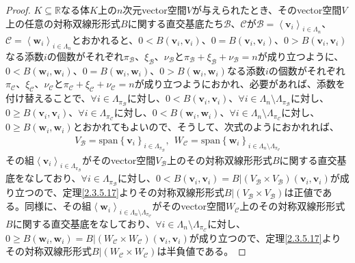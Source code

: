 \documentclass[dvipdfmx]{jsarticle}
\begin{document}
\begin{proof}
$K \subseteq \mathbb{R}$なる体$K$上の$n$次元vector空間$V$が与えられたとき、そのvector空間$V$上の任意の対称双線形形式$B$に関する直交基底たち$\mathcal{B}$、$\mathcal{C}$が$\mathcal{B} =\left\langle \mathbf{v}_{i} \right\rangle_{i \in \varLambda_{n}}$、$\mathcal{C} =\left\langle \mathbf{w}_{i} \right\rangle_{i \in \varLambda_{n}}$とおかれると、$0 < B\left( \mathbf{v}_{i},\mathbf{v}_{i} \right)$、$0 = B\left( \mathbf{v}_{i},\mathbf{v}_{i} \right)$、$0 > B\left( \mathbf{v}_{i},\mathbf{v}_{i} \right)$なる添数$i$の個数がそれぞれ$\pi_{\mathcal{B}}$、$\xi_{\mathcal{B}}$、$\nu_{\mathcal{B}}$と$\pi_{\mathcal{B}} + \xi_{\mathcal{B}} + \nu_{\mathcal{B}} = n$が成り立つように、$0 < B\left( \mathbf{w}_{i},\mathbf{w}_{i} \right)$、$0 = B\left( \mathbf{w}_{i},\mathbf{w}_{i} \right)$、$0 > B\left( \mathbf{w}_{i},\mathbf{w}_{i} \right)$なる添数$i$の個数がそれぞれ$\pi_{\mathcal{C}}$、$\xi_{\mathcal{C}}$、$\nu_{\mathcal{C}}$と$\pi_{\mathcal{C}} + \xi_{\mathcal{C}} + \nu_{\mathcal{C}} = n$が成り立つようにおかれ、必要があれば、添数を付け替えることで、$\forall i \in \varLambda_{\pi_{\mathcal{B}}}$に対し、$0 < B\left( \mathbf{v}_{i},\mathbf{v}_{i} \right)$、$\forall i \in \varLambda_{n} \setminus \varLambda_{\pi_{\mathcal{B}}}$に対し、$0 \geq B\left( \mathbf{v}_{i},\mathbf{v}_{i} \right)$、$\forall i \in \varLambda_{\pi_{\mathcal{C}}}$に対し、$0 < B\left( \mathbf{w}_{i},\mathbf{w}_{i} \right)$、$\forall i \in \varLambda_{n} \setminus \varLambda_{\pi_{\mathcal{C}}}$に対し、$0 \geq B\left( \mathbf{w}_{i},\mathbf{w}_{i} \right)$とおかれてもよいので、そうして、次式のようにおかれれば、
\begin{align*}
V_{\mathcal{B}} = {\mathrm{span}}\left\{ \mathbf{v}_{i} \right\}_{i \in \varLambda_{\pi_{\mathcal{B}}}},\ \ W_{\mathcal{C}} = {\mathrm{span}}\left\{ \mathbf{w}_{i} \right\}_{i \in \varLambda_{n} \setminus \varLambda_{\pi_{\mathcal{C}}}}
\end{align*}
その組$\left\langle \mathbf{v}_{i} \right\rangle_{i \in \varLambda_{\pi_{\mathcal{B}}}}$がそのvector空間$V_{\mathcal{B}}$上のその対称双線形形式$B$に関する直交基底をなしており、$\forall i \in \varLambda_{\pi_{\mathcal{B}}}$に対し、$0 < B\left( \mathbf{v}_{i},\mathbf{v}_{i} \right) = B|\left( V_{\mathcal{B}} \times V_{\mathcal{B}} \right)\left( \mathbf{v}_{i},\mathbf{v}_{i} \right)$が成り立つので、定理\ref{2.3.5.17}よりその対称双線形形式$B|\left( V_{\mathcal{B}} \times V_{\mathcal{B}} \right)$は正値である。同様に、その組$\left\langle \mathbf{w}_{i} \right\rangle_{i \in \varLambda_{n} \setminus \varLambda_{\pi_{\mathcal{C}}}}$がそのvector空間$W_{\mathcal{C}}$上のその対称双線形形式$B$に関する直交基底をなしており、$\forall i \in \varLambda_{n} \setminus \varLambda_{\pi_{\mathcal{C}}}$に対し、$0 \geq B\left( \mathbf{w}_{i},\mathbf{w}_{i} \right) = B|\left( W_{\mathcal{C}} \times W_{\mathcal{C}} \right)\left( \mathbf{v}_{i},\mathbf{v}_{i} \right)$が成り立つので、定理\ref{2.3.5.17}よりその対称双線形形式$B|\left( W_{\mathcal{C}} \times W_{\mathcal{C}} \right)$は半負値である。\par

\end{proof}
\end{document}

